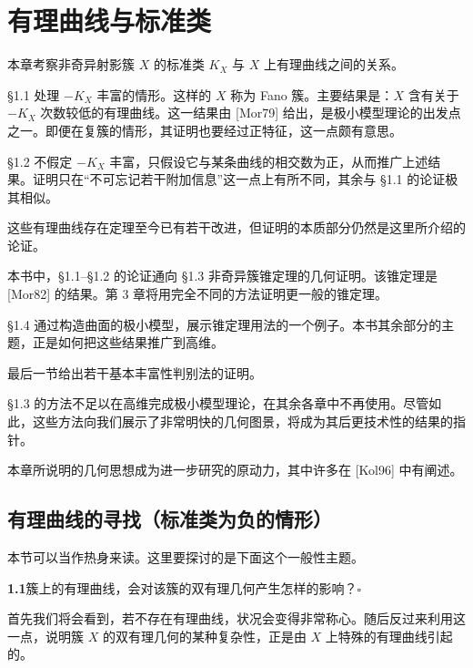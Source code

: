 \chapter{有理曲线与标准类}

本章考察非奇异射影簇 $X$ 的标准类 $K_X$ 与 $X$ 上有理曲线之间的关系。

§1.1 处理 $-K_X$ 丰富的情形。这样的 $X$ 称为 Fano 簇。主要结果是：$X$ 含有关于 $-K_X$ 次数较低的有理曲线。这一结果由 [Mor79] 给出，是极小模型理论的出发点之一。即便在复簇的情形，其证明也要经过正特征，这一点颇有意思。

§1.2 不假定 $-K_X$ 丰富，只假设它与某条曲线的相交数为正，从而推广上述结果。证明只在“不可忘记若干附加信息”这一点上有所不同，其余与 §1.1 的论证极其相似。

这些有理曲线存在定理至今已有若干改进，但证明的本质部分仍然是这里所介绍的论证。

本书中，§1.1–§1.2 的论证通向 §1.3 非奇异簇锥定理的几何证明。该锥定理是 [Mor82] 的结果。第 3 章将用完全不同的方法证明更一般的锥定理。

§1.4 通过构造曲面的极小模型，展示锥定理用法的一个例子。本书其余部分的主题，正是如何把这些结果推广到高维。

最后一节给出若干基本丰富性判别法的证明。

§1.3 的方法不足以在高维完成极小模型理论，在其余各章中不再使用。尽管如此，这些方法向我们展示了非常明快的几何图景，将成为其后更技术性的结果的指针。

本章所说明的几何思想成为进一步研究的原动力，其中许多在 [Kol96] 中有阐述。

\section{有理曲线的寻找（标准类为负的情形）}


本节可以当作热身来读。这里要探讨的是下面这个一般性主题。

\textbf{1.1}\quad 簇上的有理曲线，会对该簇的双有理几何产生怎样的影响？\hfill$\square$


首先我们将会看到，若不存在有理曲线，状况会变得非常称心。随后反过来利用这一点，说明簇 $X$ 的双有理几何的某种复杂性，正是由 $X$ 上特殊的有理曲线引起的。


